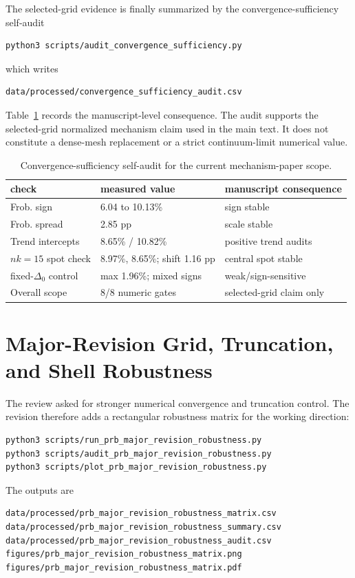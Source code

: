 \documentclass[aps,prb,preprint,superscriptaddress,floatfix,nofootinbib]{revtex4-2}
\begin{document}
The selected-grid evidence is finally summarized by the convergence-sufficiency
self-audit
\begin{verbatim}
python3 scripts/audit_convergence_sufficiency.py
\end{verbatim}
which writes
\begin{verbatim}
data/processed/convergence_sufficiency_audit.csv
\end{verbatim}
Table~\ref{tab:sm_convergence_sufficiency} records the manuscript-level
consequence.  The audit supports the selected-grid normalized mechanism claim
used in the main text.  It does not constitute a dense-mesh replacement or a
strict continuum-limit numerical value.

\begin{table}[t]
\caption{Convergence-sufficiency self-audit for the current mechanism-paper
scope.}
\label{tab:sm_convergence_sufficiency}
\small
\begin{ruledtabular}
\begin{tabular}{lll}
check & measured value & manuscript consequence\\
\hline
Frob. sign & 6.04 to 10.13\% & sign stable\\
Frob. spread & 2.85 pp & scale stable\\
Trend intercepts & 8.65\% / 10.82\% & positive trend audits\\
$nk=15$ spot check & 8.97\%, 8.65\%; shift 1.16 pp & central spot stable\\
fixed-$\Delta_0$ control & max 1.96\%; mixed signs & weak/sign-sensitive\\
Overall scope & 8/8 numeric gates & selected-grid claim only\\
\end{tabular}
\end{ruledtabular}
\end{table}

\section{Major-Revision Grid, Truncation, and Shell Robustness}

The review asked for stronger numerical convergence and truncation control.
The revision therefore adds a rectangular robustness matrix for the working
direction:
\begin{verbatim}
python3 scripts/run_prb_major_revision_robustness.py
python3 scripts/audit_prb_major_revision_robustness.py
python3 scripts/plot_prb_major_revision_robustness.py
\end{verbatim}
The outputs are
\begin{verbatim}
data/processed/prb_major_revision_robustness_matrix.csv
data/processed/prb_major_revision_robustness_summary.csv
data/processed/prb_major_revision_robustness_audit.csv
figures/prb_major_revision_robustness_matrix.png
figures/prb_major_revision_robustness_matrix.pdf
\end{verbatim}
\end{document}
